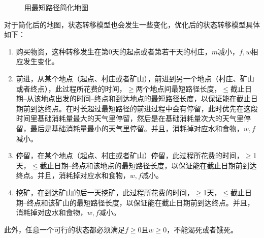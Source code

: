 \documentclass[withoutpreface,bwprint]{cumcmthesis} %
\begin{document}
\begin{figure}
\begin{minipage}[c]{0.45\textwidth}
        \label{jianhua}
    \end{minipage}
    \caption{用最短路径简化地图}
    \label{jianhuaguocheng}
\end{figure}

对于简化后的地图，状态转移模型也会发生一些变化，优化后的状态转移模型具体如下：

\begin{enumerate}
    \item 购买物资，这种转移发生在第0天的起点或者第若干天的村庄，\(m\)减小，\(f,w\)相应发生变化。
    \item 前进，从某个地点（起点、村庄或者矿山），前进到另一个地点（村庄、矿山或者终点），此过程所花费的时间，\(\geq\)两个地点间最短路径长度，\(\leq\)截止日期--从该地点出发的时间--终点和到达地点的最短路径长度，以保证能在截止日期前到达终点。在时长超过最短路径的前进过程中会有停留，此时优先在这段时间里基础消耗量最大的天气里停留，然后是在基础消耗量次大的天气里停留，最后是基础消耗量最小的天气里停留。并且，消耗掉对应水和食物，\(w,f\)减小。
    \item 停留，在某个地点（起点、村庄或者矿山）停留，此过程所花费的时间，\(\geq\)1天，\(\leq\)截止日期--终点和该地点的最短路径长度，以保证能在截止日期前到达终点。并且，消耗掉对应水和食物，\(w,f\)减小。
    \item 挖矿，在到达矿山的后一天挖矿，此过程所花费的时间，\(\geq\)1天，\(\leq\)截止日期--终点和该矿山的最短路径长度，以保证能在截止日期前到达终点。并且，消耗掉对应水和食物，\(w,f\)减小。
\end{enumerate}

此外，任意一个可行的状态都必须满足\(f\geq 0\)且\(w\geq 0\)，不能渴死或者饿死。
\end{document}
